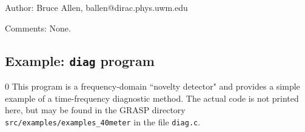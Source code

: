 
\begin{description}
\item{Author:}
Bruce Allen, ballen@dirac.phys.uwm.edu
\item{Comments:}
None.
\end{description}
\clearpage

\subsection{Example: {\tt diag} program}
\setcounter{equation}0
This program is a frequency-domain ``novelty detector" and provides a
simple example of a time-frequency diagnostic method.  
The actual code is not printed here, but may be found in the GRASP directory
{\tt src/examples/examples\_40meter} in the file {\tt diag.c}.

